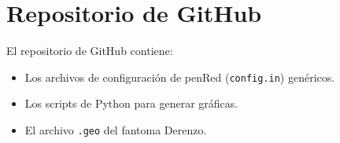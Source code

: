 \chapter{Repositorio de GitHub}
\label{anx:repo}

\begin{minipage}{0.6\textwidth}
    El repositorio de GitHub contiene:
    \begin{itemize}
        \item Los archivos de configuración de penRed (\texttt{config.in}) genéricos.
        \item Los scripts de Python para generar gráficas.
        \item El archivo \texttt{.geo} del fantoma Derenzo.
    \end{itemize}
\end{minipage}
\hfill
\begin{minipage}{0.35\textwidth}
    \centering
\end{minipage}
